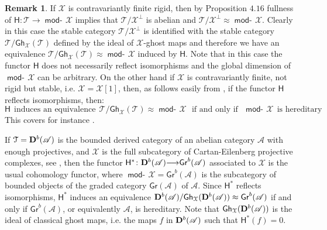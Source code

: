 \documentclass[oneside, a4paper,reqno]{amsart}
\numberwithin{equation}{section}
\theoremstyle{definition}
\newtheorem{rem}[thm]{Remark}
\begin{document}
\begin{rem} If ${\mathcal X}$ is contravariantly finite rigid, then by Proposition $4.16$ fullness of $\mathsf{H} \colon {\mathcal T} {\longrightarrow} \operatorname*{\mathsf{mod}-\!}{\mathcal X}$ implies that ${\mathcal T}/{\mathcal X}^{\bot}$ is abelian and ${\mathcal T}/{\mathcal X}^{\bot} \approx \operatorname*{\mathsf{mod}-\!}{\mathcal X}$. Clearly in this case the stable category ${\mathcal T}/{\mathcal X}^{\bot}$ is identified with the stable category ${\mathcal T}/\mathsf{Gh}_{\mathcal X}({\mathcal T})$ defined by the ideal of ${\mathcal X}$-ghost maps and therefore we have an equivalence ${\mathcal T}/\mathsf{Gh}_{\mathcal X}({\mathcal T}) \approx \operatorname*{\mathsf{mod}-\!}{\mathcal X}$ induced by $\mathsf{H}$.  Note that in this case the functor $\mathsf{H}$ does not necessarily reflect isomorphisms and the global dimension of $\operatorname*{\mathsf{mod}-\!}{\mathcal X}$ can be arbitrary.  On the other hand if ${\mathcal X}$ is contravariantly finite, not rigid but stable, i.e. ${\mathcal X} = {\mathcal X}[1]$, then, as follows easily from \cite[Theorem 5.3]{B:3cats}, if the functor $\mathsf{H}$ reflects isomorphisms, then: 
\[\mathsf{H} \ \  \text{induces an equivalence} \ \  {\mathcal T}/\mathsf{Gh}_{\mathcal X}({\mathcal T}) \approx \operatorname*{\mathsf{mod}-\!}{\mathcal X} \ \ \ \text{if and only if} \ \ \ \operatorname*{\mathsf{mod}-\!}{\mathcal X} \ \  \text{is hereditary}\]  
This covers for instance \cite[Theorem $3.1$]{KYZ}. 

If ${\mathcal T} = {\bf D}^{b}({\mathscr A})$ is the bounded derived category of an abelian category ${\mathscr A}$ with enough projectives, and  ${\mathcal X}$ is the full subcategory of Cartan-Eilenberg projective complexes, see \cite{B:3cats}, then the functor $\mathsf{H}^{*} \colon {\bf D}^{b}({\mathscr A}) {\longrightarrow} \mathsf{Gr}^{b}({\mathscr A})$ associated to ${\mathcal X}$  is the usual cohomology functor, where $\operatorname*{\mathsf{mod}-\!}{\mathcal X} = \mathsf{Gr}^{b}({\mathscr A})$ is the  subcategory of bounded objects of the graded category $\mathsf{Gr}({\mathscr A})$ of ${\mathscr A}$.  Since $\mathsf{H}^{*}$ reflects isomorphisms, $\mathsf{H}^{*}$ induces an equivalence ${\bf D}^{b}({\mathscr A})/\mathsf{Gh}_{\mathcal X}({\bf D}^{b}({\mathscr A}) ) \approx \mathsf{Gr}^{b}({\mathscr A})$ if and only if $\mathsf{Gr}^{b}({\mathscr A})$, or equivalently ${\mathscr A}$, is hereditary.  Note that $\mathsf{Gh}_{\mathcal X}({\bf D}^{b}({\mathscr A}))$ is the ideal of classical ghost maps, i.e. the maps $f$ in ${\bf D}^{b}({\mathscr A})$ such that $\mathsf{H}^{*}(f) = 0$.  
  \end{rem} 
  
\end{document}
